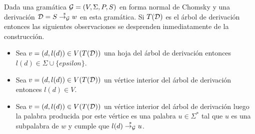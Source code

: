 \documentclass[tesis.tex]{subfiles}
\begin{document}
\begin{leoenv}
\begin{obs}\label{obs:arbol_deri_datos}
	Dada una gramática ${\cal G} = (V, \Sigma, P, S)$ \ic en forma normal de Chomsky y una derivación ${\cal D} = S \overset{*}{\to_{\cal G}} w$ en esta gramática. 
	Si $T({\cal D})$ es el árbol de derivación entonces las siguientes observaciones se desprenden inmediatamente de la construcción.
	\begin{itemize}
		\item Sea $v = (d,l(d)) \in V(T({\cal D}))$ una hoja del árbol de derivación entonces $l(d) \in \Sigma \cup \{ epsilon \}$.
		\item Sea $v = (d,l(d)) \in V(T({\cal D}))$ un vértice interior del árbol de derivación entonces $l(d) \in V$.
		\item Sea $v = (d,l(d)) \in V(T({\cal D}))$ un vértice interior del árbol de derivación luego la palabra producida por este vértice es una palabra $u \in \Sigma^{*}$ tal que $u$ es una subpalabra de $w$ y cumple que $l(d) \overset{*}{\to_{\cal G}} u$. 
	\end{itemize}
\end{obs}




	
	


	

\end{leoenv}
\end{document}
